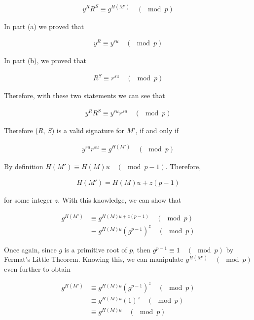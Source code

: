 \documentclass[11pt]{article}
\theoremstyle{definition}
\begin{document}
\begin{enumerate}
\begin{enumerate}
\begin{align*}
    y^RR^S \equiv g^{H(M')} \quad (\mod{p})
\end{align*}

In part (a) we proved that 

\begin{align*}
    y^R \equiv y^{ru} \quad (\mod{p})
\end{align*}

In part (b), we proved that

\begin{align*}
    R^S \equiv r^{su} \quad (\mod{p})
\end{align*}

Therefore, with these two statements we can see that

\begin{align*}
    y^RR^S \equiv y^{ru}r^{su} \quad (\mod{p})
\end{align*}

Therefore ($R$, $S$) is a valid signature for $M'$, if and only if 

\begin{align*}
    y^{ru}r^{su} \equiv g^{H(M')} \quad (\mod{p})
\end{align*}

By definition $H(M') \equiv H(M)u \quad (\mod{p - 1})$. Therefore,

\begin{align*}
    H(M') = H(M)u + z(p - 1)
\end{align*}

for some integer $z$. With this knowledge, we can show that

\begin{align*}
    g^{H(M')} &\equiv g^{H(M)u + z(p - 1)} \quad (\mod{p}) \\
    &\equiv g^{H(M)u} (g^{p - 1})^z \quad (\mod{p})
\end{align*}

Once again, since $g$ is a primitive root of $p$, then $g^{p - 1} \equiv 1 \quad (\mod{p})$ by Fermat's Little Theorem. Knowing this, we can manipulate $g^{H(M')} \quad (\mod{p})$ even further to obtain

\begin{align*}
    g^{H(M')}  &\equiv g^{H(M)u} (g^{p - 1})^z \quad (\mod{p}) \\
    &\equiv g^{H(M)u} (1)^z \quad (\mod{p}) \\
    &\equiv g^{H(M)u} \quad (\mod{p})
\end{align*}


\end{enumerate}
\end{enumerate}
\end{document}
